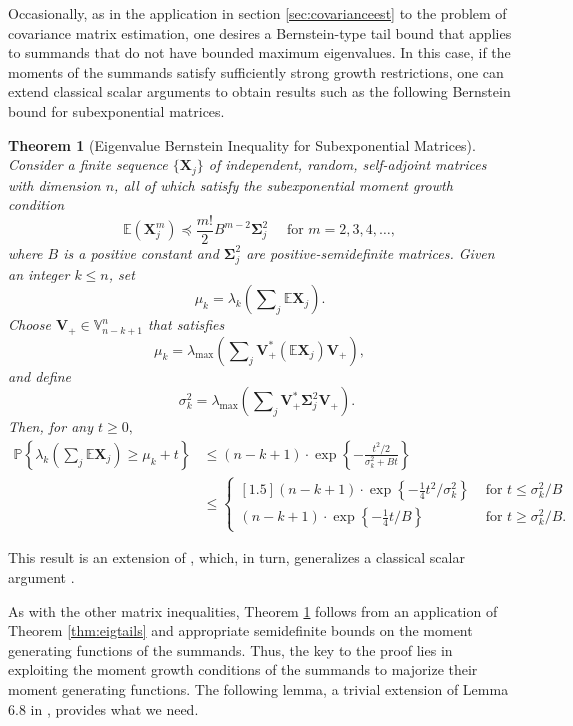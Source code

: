 \documentclass[11pt,letterpaper,twoside,reqno,nosumlimits]{amsart}
\renewcommand{\star}{*}
\newcommand{\mat}[1]{\ensuremath{\bm{#1}}} %
\newcommand{\E}{\ensuremath{\mathbb{E}}}
\newcommand{\Prob}[1]{\ensuremath{\mathbb{P}\left\{#1\right\}}}
\newcommand{\lambdamax}[1]{\ensuremath{\lambda_{\mathrm{max}}\left(#1\right)}}
\newcommand{\Isom}[2]{\ensuremath{\mathbb{V}_{#1}^{#2}}}
\newtheorem{thm}{Theorem}
\theoremstyle{remark}
\numberwithin{equation}{section}
\numberwithin{thm}{section}
\numberwithin{prop}{section}
\numberwithin{defn}{section}
\numberwithin{remark}{section}
\begin{document}
Occasionally, as in the application in section \ref{sec:covarianceest} to the problem of covariance matrix estimation, one desires a Bernstein-type tail bound that applies to summands that do not have bounded maximum eigenvalues. In this case, if the moments of the summands satisfy sufficiently strong growth restrictions, one can extend classical scalar arguments to obtain results such as the following Bernstein bound for subexponential matrices. 

\begin{thm}[Eigenvalue Bernstein Inequality for Subexponential Matrices]
Consider a finite sequence $\{\mat{X}_j\}$ of independent, random, self-adjoint matrices with dimension $n$, all of which satisfy the subexponential moment growth condition
\[
\E (\mat{X}_j^m) \preceq \frac{m!}{2} B^{m-2} \mat{\Sigma}_j^2 \quad \text{ for } m=2,3,4,\ldots,
\]
where $B$ is a positive constant and $\mat{\Sigma}_j^2$ are positive-semidefinite matrices. Given an integer $k \leq n$, set
\[
\mu_k = \lambda_k \left( \sum\nolimits_j \E \mat{X}_j \right).
\]
Choose $\mat{V}_+ \in \Isom{n-k+1}{n}$ that satisfies
\[
\mu_k = \lambdamax{ \sum\nolimits_j \mat{V}_+^\star (\E \mat{X}_j) \mat{V}_+ },
\]
and define
\[
 \quad \sigma_k^2 = \lambdamax{ \sum\nolimits_j \mat{V}_+^\star \mat{\Sigma}_j^2 \mat{V}_+ }.
\] 
Then, for any $t \geq 0,$
\begin{align}
\Prob{\lambda_k \left( \sum\nolimits_j \E \mat{X}_j \right) \geq \mu_k + t } & \leq (n-k+1) \cdot \exp\left\{ - \frac{t^2/2}{\sigma_k^2 + B t}\right\} \tag{i} \label{eqn:subexponentialbernstein} \\
 & \leq \begin{cases}[1.5]
         (n-k+1) \cdot \exp\left\{ -\tfrac{1}{4} t^2/\sigma_k^2\right\} & \text{ for } t \leq \sigma_k^2/B \\
	 (n-k+1) \cdot \exp\left\{ -\tfrac{1}{4} t/B\right\} & \text{ for } t \geq \sigma_k^2/B.
        \end{cases} \tag{ii} \label{eqn:splitsubexponentialbernstein}
\end{align}
\label{thm:subexponentialbernstein}
\end{thm}
 
This result is an extension of \cite[Theorem 6.2]{T10a}, which, in turn, generalizes a classical scalar argument \cite{DG99}.

As with the other matrix inequalities, Theorem \ref{thm:subexponentialbernstein} follows from an application of Theorem \ref{thm:eigtails} and appropriate semidefinite bounds on the moment generating functions of the summands. Thus, the key to the proof lies in exploiting the moment growth conditions of the summands to majorize their moment generating functions. The following lemma, a trivial extension of Lemma 6.8 in \cite{T10a}, provides what we need.
\end{document}

